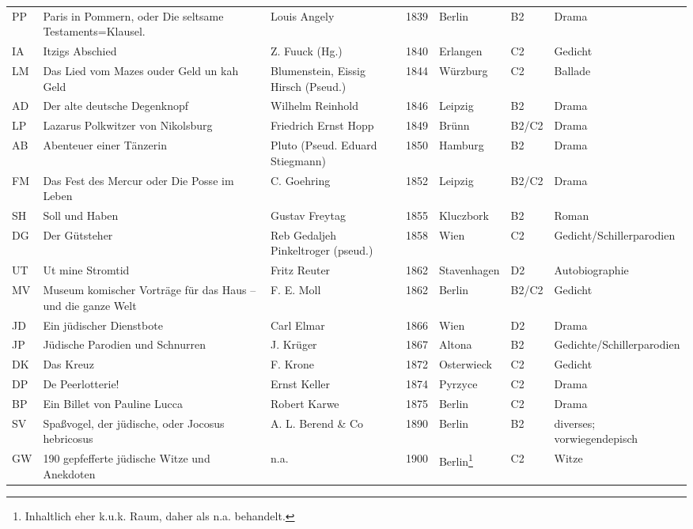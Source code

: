 \begin{longtable}{l>{\raggedright}p{2cm}>{\raggedright}p{2cm}lllp{2cm}}
PP  & Paris in Pommern, oder Die seltsame Testaments=Klausel. & Louis Angely & 1839 & Berlin & B2 & Drama \\ 
IA  & Itzigs Abschied  & Z. Fuuck (Hg.) & 1840 & Erlangen & C2 & Gedicht \\ 
LM  & Das Lied vom Mazes ouder Geld un kah Geld  & Blumenstein, Eissig Hirsch (Pseud.) & 1844 & Würzburg & C2 & Ballade \\ 
AD & Der alte deutsche Degenknopf  & Wilhelm Reinhold & 1846 & Leipzig & B2 & Drama \\ 
LP & Lazarus Polkwitzer von Nikolsburg  & Friedrich Ernst Hopp & 1849 & Brünn & B2\slash C2 & Drama \\ 
AB  & Abenteuer einer Tänzerin  & Pluto (Pseud. Eduard Stiegmann)  & 1850 & Hamburg & B2 & Drama \\ 
FM  & Das Fest des Mercur oder Die Posse im Leben  & C. Goehring & 1852 & Leipzig & B2\slash C2 & Drama \\ 
SH  & Soll und Haben  & Gustav Freytag & 1855 & Kluczbork & B2 & Roman \\ 
DG  & Der Gütsteher  & Reb Gedaljeh Pinkeltroger (pseud.) & 1858 & Wien & C2 & Gedicht\slash Schiller\-parodien \\ 
UT  & Ut mine Stromtid  & Fritz Reuter & 1862 & Stavenhagen & D2 & Auto\-biographie \\ 
MV  & Museum komischer Vorträge für das Haus – und die ganze Welt  & F. E. Moll & 1862 & Berlin & B2\slash C2 & Gedicht \\ 
JD & Ein jüdischer Dienstbote  & Carl Elmar & 1866 & Wien & D2 & Drama \\ 
JP & Jüdische Parodien und Schnurren  & J. Krüger & 1867 & Altona & B2 & Gedichte\slash Schiller\-parodien \\ 
DK  & Das Kreuz  & F. Krone & 1872 & Osterwieck & C2 & Gedicht \\ 
DP & De Peerlotterie!  & Ernst Keller & 1874 & Pyrzyce & C2 & Drama \\ 
BP & Ein Billet von Pauline Lucca  & Robert Karwe & 1875 & Berlin & C2 & Drama \\ 
SV  & Spaßvogel, der jüdische, oder Jocosus hebricosus  & A. L. Berend \& Co & 1890 & Berlin & B2 & diverses; \newline vorwiegend\newline episch \\ 
GW  & 190 gepfefferte jüdische Witze und Anekdoten  & n.a. & 1900 & Berlin\footnote{Inhaltlich eher k.u.k. Raum, daher als n.a. behandelt.} & C2 & Witze \\ 

\end{longtable}
